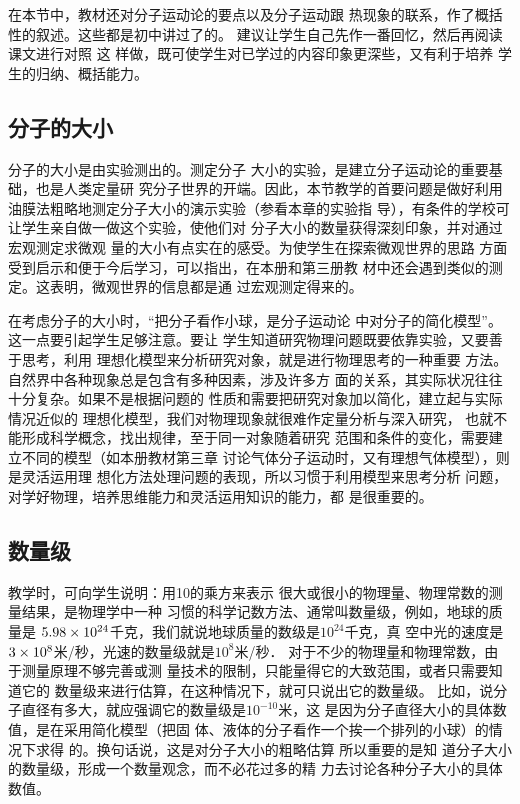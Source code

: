 在本节中，教材还对分子运动论的要点以及分子运动跟
热现象的联系，作了概括性的叙述。这些都是初中讲过了的。
建议让学生自己先作一番回忆，然后再阅读课文进行对照 这
样做，既可使学生对已学过的内容印象更深些，又有利于培养
学生的归纳、概括能力。

\subsection{分子的大小} 分子的大小是由实验测出的。测定分子
大小的实验，是建立分子运动论的重要基础，也是人类定量研
究分子世界的开端。因此，本节教学的首要问题是做好利用
油膜法粗略地测定分子大小的演示实验（参看本章的实验指
导），有条件的学校可让学生亲自做一做这个实验，使他们对
分子大小的数量获得深刻印象，并对通过宏观测定求微观
量的大小有点实在的感受。为使学生在探索微观世界的思路
方面受到启示和便于今后学习，可以指出，在本册和第三册教
材中还会遇到类似的测定。这表明，微观世界的信息都是通
过宏观测定得来的。

在考虑分子的大小时，“把分子看作小球，是分子运动论
中对分子的简化模型”。这一点要引起学生足够注意。要让
学生知道研究物理问题既要依靠实验，又要善于思考，利用
理想化模型来分析研究对象，就是进行物理思考的一种重要
方法。自然界中各种现象总是包含有多种因素，涉及许多方
面的关系，其实际状况往往十分复杂。如果不是根据问题的
性质和需要把研究对象加以简化，建立起与实际情况近似的
理想化模型，我们对物理现象就很难作定量分析与深入研究，
也就不能形成科学概念，找出规律，至于同一对象随着研究
范围和条件的变化，需要建立不同的模型（如本册教材第三章
讨论气体分子运动时，又有理想气体模型），则是灵活运用理
想化方法处理问题的表现，所以习惯于利用模型来思考分析
问题，对学好物理，培养思维能力和灵活运用知识的能力，都
是很重要的。

\subsection{数量级}
教学时，可向学生说明：用10的乘方来表示
很大或很小的物理量、物理常数的测量结果，是物理学中一种
习惯的科学记数方法、通常叫数量级，例如，地球的质量是
$5.98\times10^{24}$千克，我们就说地球质量的数级是$10^{24}$千克，真
空中光的速度是$3\times10^8$米/秒，光速的数量级就是$10^8$米/秒．
对于不少的物理量和物理常数，由于测量原理不够完善或测
量技术的限制，只能量得它的大致范围，或者只需要知道它的
数量级来进行估算，在这种情况下，就可只说出它的数量级。
比如，说分子直径有多大，就应强调它的数量级是$10^{-10}$米，这
是因为分子直径大小的具体数值，是在采用简化模型（把固
体、液体的分子看作一个挨一个排列的小球）的情况下求得
的。换句话说，这是对分子大小的粗略估算 所以重要的是知
道分子大小的数量级，形成一个数量观念，而不必花过多的精
力去讨论各种分子大小的具体数值。

